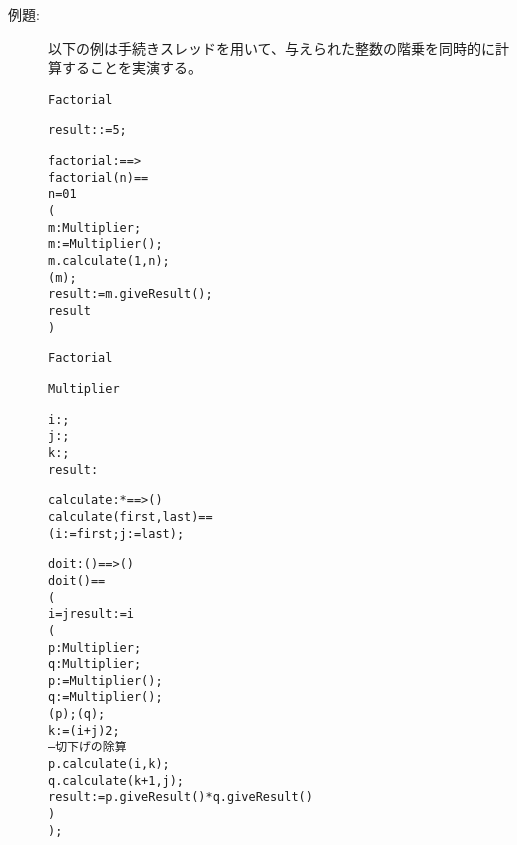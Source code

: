 \documentclass[\pformat,12pt]{jarticle}
\begin{document}
\begin{description}
%
%
\item[例題:]  \mbox{}
以下の例は手続きスレッドを用いて、与えられた整数の階乗を同時的に計算することを実演する。

\begin{alltt}
     Factorial

     
      result :  := 5;

     factorial :  ==> 
    factorial(n) == 
       n = 0   1
       (
         m : Multiplier;
        m :=  Multiplier();
        m.calculate(1,n);
        (m);
        result:= m.giveResult();
         result
      )

     Factorial

     Multiplier

     
      i : ;
      j : ; 
      k : ;  
      result : 


     calculate :  *  ==> ()
    calculate (first, last) ==  
      (i := first; j := last);

    doit : () ==> ()
    doit() ==
      (
         i = j  result := i
        (
          p : Multiplier;
          q : Multiplier;
         p :=  Multiplier();  
         q :=  Multiplier();  
         (p);(q);  
         k := (i + j)   2;
         -- 切下げの除算
         p.calculate(i,k);  
         q.calculate(k+1,j);  
         result := p.giveResult() *  q.giveResult ()
        )
      );



\end{alltt}
\end{description}
\end{document}
